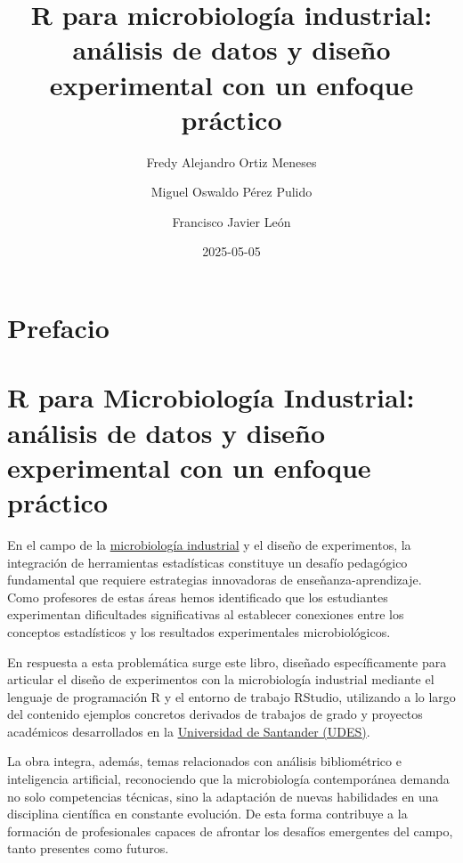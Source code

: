 \documentclass[
  spanish,
  letterpaper,
  DIV=11,
  numbers=noendperiod]{scrreprt}
\title{R para microbiología industrial: análisis de datos y diseño
experimental con un enfoque práctico}
\author{Fredy Alejandro Ortiz Meneses \and Miguel Oswaldo Pérez
Pulido \and Francisco Javier León}
\date{2025-05-05}
\renewcommand*\contentsname{Tabla de contenidos}
\newcommand\contentsname{Tabla de contenidos}
\begin{document}
\maketitle

\renewcommand*\contentsname{Tabla de contenidos}
{
\hypersetup{linkcolor=}
\setcounter{tocdepth}{2}
\tableofcontents
}


\chapter{Prefacio}\label{prefacio}


\chapter*{R para Microbiología Industrial: análisis de datos y diseño
experimental con un enfoque
práctico}\label{r-para-microbiologuxeda-industrial-anuxe1lisis-de-datos-y-diseuxf1o-experimental-con-un-enfoque-pruxe1ctico}


En el campo de la
\href{https://bucaramanga.udes.edu.co/estudia/pregrados/microbiologia-industrial}{microbiología
industrial} y el diseño de experimentos, la integración de herramientas
estadísticas constituye un desafío pedagógico fundamental que requiere
estrategias innovadoras de enseñanza-aprendizaje. Como profesores de
estas áreas hemos identificado que los estudiantes experimentan
dificultades significativas al establecer conexiones entre los conceptos
estadísticos y los resultados experimentales microbiológicos.

En respuesta a esta problemática surge este libro, diseñado
específicamente para articular el diseño de experimentos con la
microbiología industrial mediante el lenguaje de programación R y el
entorno de trabajo RStudio, utilizando a lo largo del contenido ejemplos
concretos derivados de trabajos de grado y proyectos académicos
desarrollados en la \href{https://udes.edu.co/}{Universidad de Santander
(UDES)}.

La obra integra, además, temas relacionados con análisis bibliométrico e
inteligencia artificial, reconociendo que la microbiología contemporánea
demanda no solo competencias técnicas, sino la adaptación de nuevas
habilidades en una disciplina científica en constante evolución. De esta
forma contribuye a la formación de profesionales capaces de afrontar los
desafíos emergentes del campo, tanto presentes como futuros.
\end{document}
